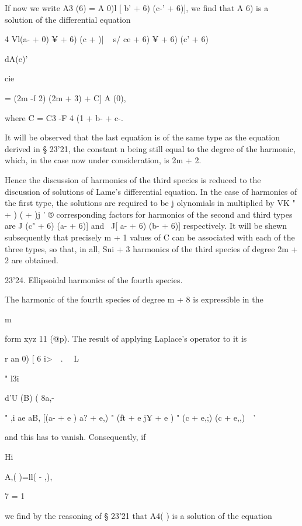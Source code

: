 {If now we write A3 (6) = A  0)l [ b' + 6) (c-' + 6)], 
we find that A  6) is a solution of the differential equation 



4 Vl(a-  + 0)  ¥ + 6) (c  +  )| ~ s/  ce + 6)  ¥ + 6) (c' + 6)  



dA(e)' 

cie 



=  (2m -f 2) (2m + 3)   + C] A (0), 

where C = C3 -F 4 (1  + b- + c-. 

It will be observed that the last equation is of the same type as the 
equation derived in § 23'21, the constant n being still equal to the degree 
of the harmonic, which, in the case now under consideration, is 2m + 2. 

Hence the discussion of harmonics of the third species is reduced to 
the discussion of solutions of Lame's differential equation. In the case of 
harmonics of the first type, the solutions are required to be j olynomials in 
multiplied by VK " +  ) (  +  )j '  ® corresponding factors for harmonics of 
the second and third types are  J (c" + 6) (a- + 6)] and \ J[ a- + 6) (b- + 6)] 
respectively. It will be shewn subsequently that precisely m + 1 values of C 
can be associated with each of the three types, so that, in all, Sni + 3 harmonics 
of the third species of degree 2m + 2 are obtained. 

23'24. Ellipsoidal harmonics of the fourth species. 

The harmonic of the fourth species of degree  m + 8 is expressible in the 

m 

form xyz 11 (@p). The result of applying Laplace's operator to it is 

r   an 0) [ 6 i>\ \  . \ \ L 

"   l3i  %

  d'U (B) ( 8a,-  \ %

"  ,i ae aB, [(a-  + e )  a? + e,) "  (ft  + e j¥ + e ) "  (c  + e,;) (c  + e,,)\ \  ' 

and this has to vanish. Consequently, if 

Hi 

A,( )=ll( - ,), 

7 = 1 

we find by the reasoning of § 23'21 that A4( ) is a solution of the equation 

}
